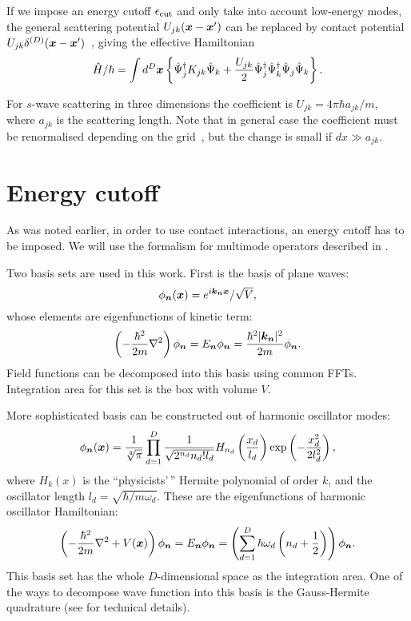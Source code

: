 If we impose an energy cutoff $\epsilon_{\mathrm{cut}}$ and only take into account low-energy modes,
the general scattering potential $U_{jk}(\boldsymbol{x} - \boldsymbol{x}^\prime)$ can be replaced by contact potential $U_{jk} \delta^{(D)}(\boldsymbol{x} - \boldsymbol{x}^\prime)$~\cite{Morgan2000}, giving the effective Hamiltonian
\begin{equation}
\label{eqn:wigner:hamiltonian_effective}
\begin{split}
	\hat{H} / \hbar = \int d^{D}\boldsymbol{x} \left\{
		\hat{\Psi}_j^{\dagger} K_{jk} \hat{\Psi}_k
		+ \frac{U_{jk}}{2} \hat{\Psi}_j^\dagger \hat{\Psi}_k^\dagger \hat{\Psi}_j \hat{\Psi}_k
	\right\}.
\end{split}
\end{equation}

For $s$-wave scattering in three dimensions the coefficient is $U_{jk} = 4 \pi \hbar a_{jk} / m$,
where $a_{jk}$ is the scattering length.
Note that in general case the coefficient must be renormalised depending on the grid~\cite{Sinatra2002},
but the change is small if $dx \gg a_{jk}$.


\section{Energy cutoff}

As was noted earlier, in order to use contact interactions, an energy cutoff has to be imposed.
We will use the formalism for multimode operators described in .

Two basis sets are used in this work.
First is the basis of plane waves:
\[
	\phi_{\boldsymbol{n}}(\boldsymbol{x}) = e^{i \boldsymbol{k}_{\boldsymbol{n}} \boldsymbol{x}} / \sqrt{V},
\]
whose elements are eigenfunctions of kinetic term:
\[
	\left( -\frac{\hbar^2}{2m} \nabla^2 \right) \phi_{\boldsymbol{n}}
	= E_{\boldsymbol{n}} \phi_{\boldsymbol{n}}
	= \frac{\hbar^2 \lvert \boldsymbol{k}_{\boldsymbol{n}} \rvert^2}{2 m} \phi_{\boldsymbol{n}}.
\]
Field functions can be decomposed into this basis using common FFTs.
Integration area for this set is the box with volume $V$.

More sophisticated basis can be constructed out of harmonic oscillator modes:
\[
	\phi_{\boldsymbol{n}}(\boldsymbol{x}) = \frac{1}{\sqrt[4]{\pi}}
		\prod\limits_{d=1}^{D}
			\frac{1}{\sqrt{2^{n_d} n_d! l_d}}
			H_{n_d} \left( \frac{x_d}{l_d} \right)
			\exp \left( -\frac{x_d^2}{2 l_d^2} \right),
\]
where $H_k(x)$ is the ``physicists'\,'' Hermite polynomial of order $k$,
and the oscillator length $l_d = \sqrt{\hbar / m \omega_d}$.
These are the eigenfunctions of harmonic oscillator Hamiltonian:
\[
	\left( -\frac{\hbar^2}{2m} \nabla^2 + V(\boldsymbol{x}) \right) \phi_{\boldsymbol{n}}
	= E_{\boldsymbol{n}} \phi_{\boldsymbol{n}}
	= \left(
		\sum\limits_{d=1}^D \hbar \omega_d \left(
			n_d + \frac{1}{2}
		\right)
	\right) \phi_{\boldsymbol{n}}.
\]
This basis set has the whole $D$-dimensional space as the integration area.
One of the ways to decompose wave function into this basis is the Gauss-Hermite quadrature
(see  for technical details).

